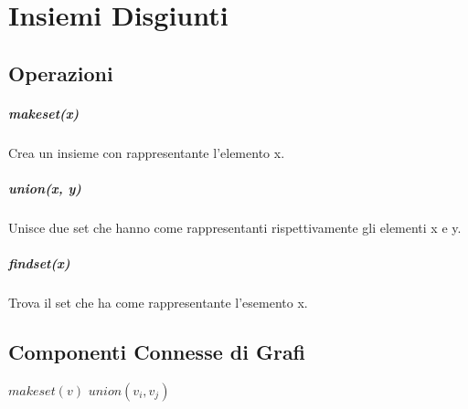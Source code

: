 \chapter{Insiemi Disgiunti}

\section{Operazioni}

\paragraph{makeset(x)}

Crea un insieme con rappresentante l'elemento x.

\paragraph{union(x, y)}

Unisce due set che hanno come rappresentanti rispettivamente gli elementi x e y.

\paragraph{findset(x)}

Trova il set che ha come rappresentante l'esemento x.

\section{Componenti Connesse di Grafi}

\begin{algorithm}
    \begin{algorithmic}
                \State $makeset(v)$
            \EndFor
                    \State $union(v_i, v_j)$
                \EndIf
            \EndFor
        \EndProcedure
    \end{algorithmic}
\end{algorithm}
